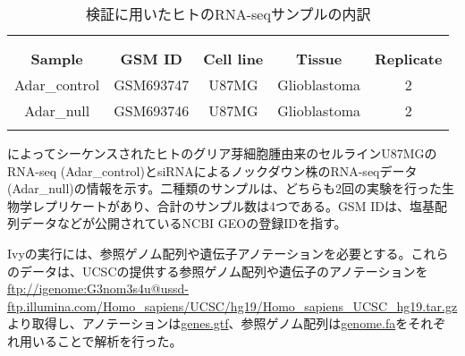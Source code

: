 \begin{longtable}{ccccc}
	\vspace{-0.5cm}
	\label{tab:bahn_sample}\\
	\caption{検証に用いたヒトのRNA-seqサンプルの内訳}\\
	\cline{1-5}
	\textbf{Sample} & \textbf{GSM ID} & \textbf{Cell line} & \textbf{Tissue} & \textbf{Replicate}\\
	\cline{1-5}
	Adar\_control & GSM693747 & U87MG & Glioblastoma & 2\\
	Adar\_null & GSM693746 & U87MG & Glioblastoma & 2\\
	\cline{1-5}
	\vspace{-0.8cm}
\end{longtable}

\begin{flushleft}
	\small{\cite{BahLeeLi1201}によってシーケンスされたヒトのグリア芽細胞腫由来のセルラインU87MGのRNA-seq (Adar\_control)とsiRNAによるノックダウン株のRNA-seqデータ (Adar\_null)の情報を示す。二種類のサンプルは、どちらも2回の実験を行った生物学レプリケートがあり、合計のサンプル数は4つである。GSM IDは、塩基配列データなどが公開されているNCBI GEOの登録IDを指す。}
\end{flushleft}

Ivyの実行には、参照ゲノム配列や遺伝子アノテーションを必要とする。これらのデータは、UCSCの提供する参照ゲノム配列や遺伝子のアノテーションを\url{ftp://igenome:G3nom3s4u@ussd-ftp.illumina.com/Homo_sapiens/UCSC/hg19/Homo_sapiens_UCSC_hg19.tar.gz}より取得し、アノテーションは\url{genes.gtf}、参照ゲノム配列は\url{genome.fa}をそれぞれ用いることで解析を行った。


